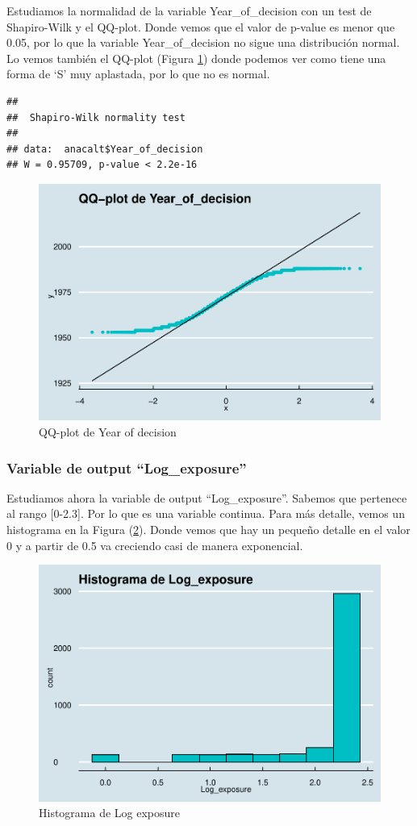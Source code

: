 \documentclass[
]{article}
\begin{document}
Estudiamos la normalidad de la variable Year\_of\_decision con un test
de Shapiro-Wilk y el QQ-plot. Donde vemos que el valor de p-value es
menor que 0.05, por lo que la variable Year\_of\_decision no sigue una
distribución normal. Lo vemos también el QQ-plot (Figura
\ref{fig:qq_year}) donde podemos ver como tiene una forma de `S' muy
aplastada, por lo que no es normal.

\begin{verbatim}
## 
##  Shapiro-Wilk normality test
## 
## data:  anacalt$Year_of_decision
## W = 0.95709, p-value < 2.2e-16
\end{verbatim}

\begin{figure}

{\centering \includegraphics[width=0.5\linewidth]{anacalt-regresion_files/figure-latex/qq_year-1} 

}

\caption{QQ-plot de Year of decision}\label{fig:qq_year}
\end{figure}

\hypertarget{variable-de-output-log_exposure}{%
\subsubsection{Variable de output
``Log\_exposure''}\label{variable-de-output-log_exposure}}

Estudiamos ahora la variable de output ``Log\_exposure''. Sabemos que
pertenece al rango {[}0-2.3{]}. Por lo que es una variable continua.
Para más detalle, vemos un histograma en la Figura (\ref{fig:hist_log}).
Donde vemos que hay un pequeño detalle en el valor 0 y a partir de 0.5
va creciendo casi de manera exponencial.

\begin{figure}

{\centering \includegraphics[width=0.5\linewidth]{anacalt-regresion_files/figure-latex/hist_log-1} 

}

\caption{Histograma de Log exposure}\label{fig:hist_log}
\end{figure}
\end{document}
